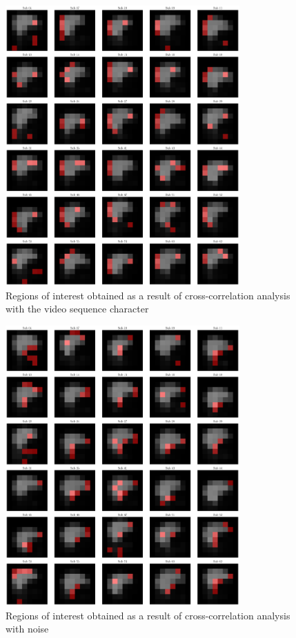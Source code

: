 \documentclass[a4paper, 12pt]{extarticle}
\begin{document}
\begin{figure}[h!]
    \centering
    \includegraphics[width=0.8\textwidth]{cross_correlations.pdf}
    \caption{Regions of interest obtained as a result of cross-correlation analysis with the video sequence character}
\end{figure}
\begin{figure}[h!]
    \centering
    \includegraphics[width=0.8\textwidth]{cross_correlations_trash.pdf}
    \caption{Regions of interest obtained as a result of cross-correlation analysis with noise}
\end{figure}
\end{document}
